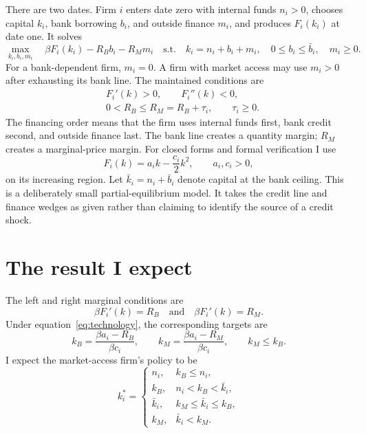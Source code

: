 \documentclass[11pt]{article}
\newcommand{\kb}{k_B}
\newcommand{\km}{k_M}
\newcommand{\Rb}{R_B}
\newcommand{\Rm}{R_M}
\begin{document}
There are two dates. Firm $i$ enters date zero with internal funds $n_i>0$,
chooses capital $k_i$, bank borrowing $b_i$, and outside finance $m_i$, and
produces $F_i(k_i)$ at date one. It solves
\begin{equation}\label{eq:problem}
 \max_{k_i,b_i,m_i}\quad
 \beta F_i(k_i)-\Rb b_i-\Rm m_i
 \quad\text{s.t.}\quad
 k_i=n_i+b_i+m_i,\quad 0\leq b_i\leq\bar b_i,\quad m_i\geq0.
\end{equation}
For a bank-dependent firm, $m_i=0$. A firm with market access may use $m_i>0$
after exhausting its bank line. The maintained conditions are
\begin{align*}
 &F_i'(k)>0,\qquad F_i''(k)<0,\\
 &0<\Rb\leq\Rm=\Rb+\tau_i,\qquad \tau_i\geq0.
\end{align*}
The financing order means that the firm uses internal funds first, bank credit
second, and outside finance last. The bank line creates a quantity margin;
$\Rm$ creates a marginal-price margin. For closed forms and formal verification
I use
\begin{equation}\label{eq:technology}
 F_i(k)=a_i k-\frac{c_i}{2}k^2,\qquad a_i,c_i>0,
\end{equation}
on its increasing region. Let $\bar k_i=n_i+\bar b_i$ denote capital at the bank
ceiling. This is a deliberately small partial-equilibrium model. It takes the
credit line and finance wedges as given rather than claiming to identify the
source of a credit shock.

\section{The result I expect}

The left and right marginal conditions are
\begin{equation}\label{eq:focs}
 \beta F_i'(k)=\Rb
 \quad\text{and}\quad
 \beta F_i'(k)=\Rm.
\end{equation}
Under equation~\eqref{eq:technology}, the corresponding targets are
\[
 \kb=\frac{\beta a_i-\Rb}{\beta c_i},
 \qquad
 \km=\frac{\beta a_i-\Rm}{\beta c_i},
 \qquad \km\leq\kb.
\]
I expect the market-access firm's policy to be
\begin{equation}\label{eq:policy}
k_i^*=\begin{cases}
n_i, & \kb\leq n_i,\\
\kb, & n_i<\kb<\bar k_i,\\
\bar k_i, & \km\leq\bar k_i\leq\kb,\\
\km, & \bar k_i<\km.
\end{cases}
\end{equation}
\end{document}
